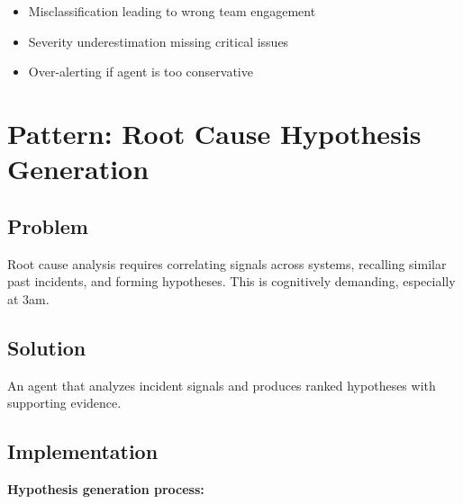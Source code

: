 \begin{itemize}
    \item Misclassification leading to wrong team engagement
    \item Severity underestimation missing critical issues
    \item Over-alerting if agent is too conservative
\end{itemize}

\section{Pattern: Root Cause Hypothesis Generation}
\label{sec:rca-hypothesis}

\subsection{Problem}

Root cause analysis requires correlating signals across systems, recalling similar past incidents, and forming hypotheses. This is cognitively demanding, especially at 3am.

\subsection{Solution}

An agent that analyzes incident signals and produces ranked hypotheses with supporting evidence.

\subsection{Implementation}

\textbf{Hypothesis generation process:}

